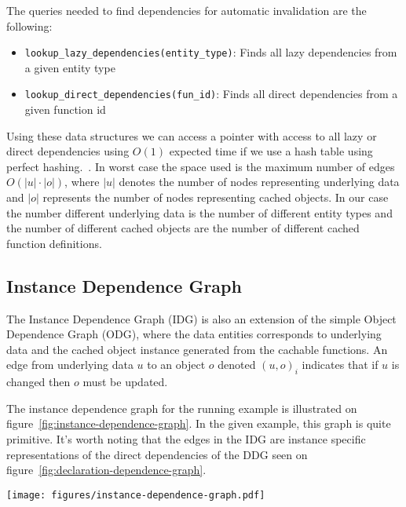 The queries needed to find dependencies for automatic invalidation are the following:

\begin{itemize}
  \item \verb$lookup_lazy_dependencies(entity_type)$: Finds all lazy dependencies from a given entity type
  \item \verb$lookup_direct_dependencies(fun_id)$: Finds all direct dependencies from a given function id
\end{itemize}

Using these data structures we can access a pointer with access to all lazy or direct dependencies using $O(1)$ expected time if we use a hash table using perfect hashing.~\cite{paper:perfect-hashing}. In worst case the space used is the maximum number of edges $O(|u| \cdot |o|)$, where $|u|$ denotes the number of nodes representing underlying data and $|o|$ represents the number of nodes representing cached objects. In our case the number different underlying data is the number of different entity types and the number of different cached objects are the number of different cached function definitions.


\subsection{Instance Dependence Graph}
\label{subsec:instance-dependence-graph}

The Instance Dependence Graph (IDG) is also an extension of the simple Object Dependence Graph (ODG), where the data entities corresponds to underlying data and the cached object instance generated from the cachable functions. An edge from underlying data $u$ to an object $o$ denoted $(u, o)_i$ indicates that if $u$ is changed then $o$ must be updated.

The instance dependence graph for the running example is illustrated on figure~\ref{fig:instance-dependence-graph}. In the given example, this graph is quite primitive. It's worth noting that the edges in the IDG are instance specific representations of the direct dependencies of the DDG seen on figure~\ref{fig:declaration-dependence-graph}.

\begin{figure*}[ht!]
  \centering
  \texttt{[image: figures/instance-dependence-graph.pdf]}
  \caption{An example of an Instance Dependence Graph based on the running example, where we have a single course entity that have two participant entities.}
  \label{fig:instance-dependence-graph}
\end{figure*}

